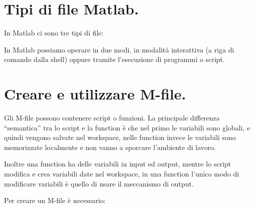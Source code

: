 \section{Tipi di file Matlab.}
In Matlab ci sono tre tipi di file:

In Matlab possiamo operare in due modi, in modalità interattiva (a riga di 
comando dalla shell) oppure tramite l'esecuzione di programmi o script.

\section{Creare e utilizzare M-file.}
Gli M-file possono contenere script o funzioni. La principale differenza 
``semantica'' tra lo script e la function è che nel primo le variabili sono
globali, e quindi vengono salvate nel workspace, nelle function invece le
variabili sono memorizzate localmente e non vanno a sporcare l'ambiente di 
lavoro.

Inoltre una function ha delle variabili in input ed output, mentre lo script
modifica e crea variabili date nel workspace, in una function l'unico
modo di modificare variabili è quello di usare il meccanismo di output.

Per creare un M-file è necessario:

